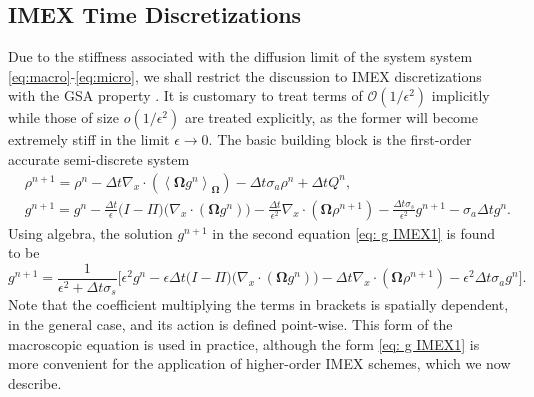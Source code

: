\documentclass[onefignum,onetabnum]{siamart220329}
\begin{document}
\subsection{IMEX Time Discretizations}
\label{subsec:IMEX}

Due to the stiffness associated with the diffusion limit of the system system \eqref{eq:macro}-\eqref{eq:micro}, we shall restrict the discussion to IMEX discretizations with the GSA property \cite{BoscarinoAP-IMEX2013}. It is customary to treat terms of $\mathcal{O}(1/\epsilon^{2})$ implicitly while those of size $o(1/\epsilon^{2})$ are treated explicitly, as the former will become extremely stiff in the limit $\epsilon \rightarrow 0$. The basic building block is the first-order accurate semi-discrete system
\begin{align}
    &\rho^{n+1} = \rho^{n}  - \Delta t \nabla_{x} \cdot \left( \left\langle \mathbf{\Omega} g^{n} \right\rangle_{\mathbf{\Omega}} \right) - \Delta t \sigma_{a} \rho^{n} + \Delta t Q^{n}, \label{eq: rho IMEX1} \\
    &g^{n+1} = g^{n} -\frac{\Delta t}{\epsilon} \Big( I - \Pi \Big) \Big( \nabla_{x} \cdot \left(  \mathbf{\Omega} g^{n} \right) \Big) - \frac{\Delta t}{\epsilon^{2}} \nabla_{x} \cdot \left( \mathbf{\Omega} \rho^{n+1} \right) - \frac{\Delta t \sigma_{s}}{\epsilon^{2}} g^{n+1} - \sigma_{a} \Delta t g^{n}. \label{eq: g IMEX1}
\end{align}
Using algebra, the solution $g^{n+1}$ in the second equation \eqref{eq: g IMEX1} is found to be
\begin{equation*}
    g^{n+1} = \frac{1}{\epsilon^{2} + \Delta t \sigma_{s}} \Bigg[ \epsilon^{2}g^{n} -\epsilon \Delta t \Big( I - \Pi \Big) \Big( \nabla_{x} \cdot \left(  \mathbf{\Omega} g^{n} \right) \Big) - \Delta t \nabla_{x} \cdot \left( \mathbf{\Omega} \rho^{n+1} \right) - \epsilon^{2} \Delta t \sigma_{a} g^{n} \Bigg].
\end{equation*}
Note that the coefficient multiplying the terms in brackets is spatially dependent, in the general case, and its action is defined point-wise. This form of the macroscopic equation is used in practice, although the form \eqref{eq: g IMEX1} is more convenient for the application of higher-order IMEX schemes, which we now describe.
 
\end{document}
